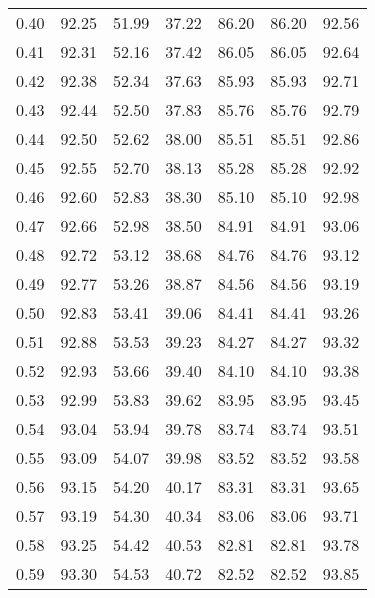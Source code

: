 \begin{tabular}{|c|c|c|c|c|c|c|}
      0.40 &     92.25 &     51.99 &      37.22 &   86.20 &      86.20 &         92.56 \\
      0.41 &     92.31 &     52.16 &      37.42 &   86.05 &      86.05 &         92.64 \\
      0.42 &     92.38 &     52.34 &      37.63 &   85.93 &      85.93 &         92.71 \\
      0.43 &     92.44 &     52.50 &      37.83 &   85.76 &      85.76 &         92.79 \\
      0.44 &     92.50 &     52.62 &      38.00 &   85.51 &      85.51 &         92.86 \\
      0.45 &     92.55 &     52.70 &      38.13 &   85.28 &      85.28 &         92.92 \\
      0.46 &     92.60 &     52.83 &      38.30 &   85.10 &      85.10 &         92.98 \\
      0.47 &     92.66 &     52.98 &      38.50 &   84.91 &      84.91 &         93.06 \\
      0.48 &     92.72 &     53.12 &      38.68 &   84.76 &      84.76 &         93.12 \\
      0.49 &     92.77 &     53.26 &      38.87 &   84.56 &      84.56 &         93.19 \\
      0.50 &     92.83 &     53.41 &      39.06 &   84.41 &      84.41 &         93.26 \\
      0.51 &     92.88 &     53.53 &      39.23 &   84.27 &      84.27 &         93.32 \\
      0.52 &     92.93 &     53.66 &      39.40 &   84.10 &      84.10 &         93.38 \\
      0.53 &     92.99 &     53.83 &      39.62 &   83.95 &      83.95 &         93.45 \\
      0.54 &     93.04 &     53.94 &      39.78 &   83.74 &      83.74 &         93.51 \\
      0.55 &     93.09 &     54.07 &      39.98 &   83.52 &      83.52 &         93.58 \\
      0.56 &     93.15 &     54.20 &      40.17 &   83.31 &      83.31 &         93.65 \\
      0.57 &     93.19 &     54.30 &      40.34 &   83.06 &      83.06 &         93.71 \\
      0.58 &     93.25 &     54.42 &      40.53 &   82.81 &      82.81 &         93.78 \\
      0.59 &     93.30 &     54.53 &      40.72 &   82.52 &      82.52 &         93.85 \\

\end{tabular}
